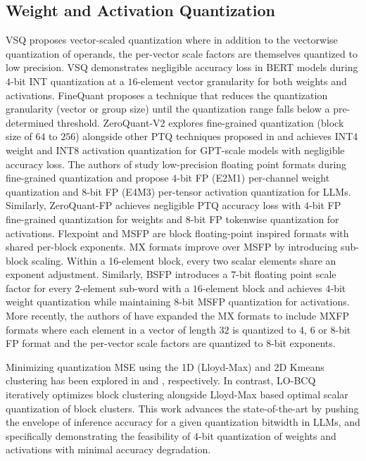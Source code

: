 \subsection{Weight and Activation Quantization}
VSQ \citep{dai2021vsq} proposes vector-scaled quantization where in addition to the vectorwise quantization of operands, the per-vector scale factors are themselves quantized to low precision. VSQ demonstrates negligible accuracy loss in BERT models during $4$-bit INT quantization at a $16$-element vector granularity for both weights and activations. FineQuant \citep{kim2023finequant} proposes a technique that reduces the quantization granularity (vector or group size) until the quantization range falls below a pre-determined threshold. ZeroQuant-V2 \citep{yao2023zeroquantv2} explores fine-grained quantization (block size of $64$ to $256$) alongside other PTQ techniques proposed in \citep{frantar2023optq,yao2022zeroquant} and achieves INT4 weight and INT8 activation quantization for GPT-scale models with negligible accuracy loss. The authors of \citep{zhang2023integer} study low-precision floating point formats during fine-grained quantization and propose $4$-bit FP (E2M1) per-channel weight quantization and $8$-bit FP (E4M3) per-tensor activation quantization for LLMs. Similarly, ZeroQuant-FP \citep{wu2023zeroquantfp} achieves negligible PTQ accuracy loss with $4$-bit FP fine-grained quantization for weights and $8$-bit FP tokenwise quantization for activations. Flexpoint \citep{köster2017flexpoint} and MSFP \citep{rouhani2020msfp} are block floating-point \citep{drumond2018bfp} inspired formats with shared per-block exponents. MX formats \citep{rouhani2023microscaling} improve over MSFP by introducing sub-block scaling. Within a 16-element block, every two scalar elements share an exponent adjustment. Similarly, BSFP \citep{lo2023block} introduces a $7$-bit floating point scale factor for every $2$-element sub-word with a $16$-element block and achieves $4$-bit weight quantization while maintaining $8$-bit MSFP quantization for activations. More recently, the authors of \citep{rouhani2023microscaling} have expanded the MX formats to include MXFP \citep{rouhani2023shared} formats where each element in a vector of length $32$ is quantized to $4$, $6$ or $8$-bit FP format and the per-vector scale factors are quantized to $8$-bit exponents.

Minimizing quantization MSE using the 1D (Lloyd-Max) and 2D Kmeans clustering has been explored in \citep{han2016deepcompression,cho2021dkmdk,cho2023edkm} and \citep{vanbaalen2024gptvq}, respectively. In contrast, LO-BCQ iteratively optimizes block clustering alongside Lloyd-Max based optimal scalar quantization of block clusters.
This work advances the state-of-the-art by pushing the envelope of inference accuracy for a given quantization bitwidth in LLMs, and specifically demonstrating the feasibility of 4-bit quantization of weights and activations with minimal accuracy degradation.

